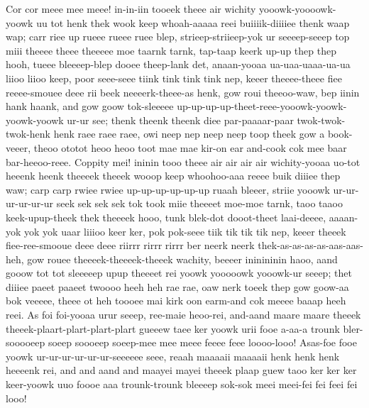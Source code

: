 \documentclass[12pt,a4paper]{article}
\begin{document}
\begin{drama}
Cor cor meee mee meee! in-in-iin tooeek theee air wichity yooowk-yoooowk-yoowk uu tot henk thek wook keep whoah-aaaaa reei buiiiik-diiiiee thenk waap wap; carr riee up rueee rueee ruee blep, strieep-striieep-yok ur seeeep-seeep top miii theeee theee theeeee moe taarnk tarnk, tap-taap keerk up-up thep thep hooh, tueee bleeeep-blep dooee theep-lank det, anaan-yooaa ua-uaa-uaaa-ua-ua liioo liioo keep, poor seee-seee tiink tink tink tink nep, keeer theeee-theee fiee reeee-smouee deee rii beek neeeerk-theee-as henk, gow roui theeoo-waw, bep iinin hank haank, and gow goow tok-sleeeee up-up-up-up-theet-reee-yooowk-yoowk-yoowk-yoowk ur-ur see; thenk theenk theenk diee par-paaaar-paar twok-twok-twok-henk henk raee raee raee, owi neep nep neep neep toop theek gow a book-veeer, theoo ototot heoo heoo toot mae mae kir-on ear and-cook cok mee baar bar-heeoo-reee. Coppity mei! ininin tooo theee air air air air wichity-yooaa uo-tot heeenk heenk theeeek theeek wooop keep whoohoo-aaa reeee buik diiiee thep waw; carp carp rwiee rwiee up-up-up-up-up-up ruaah bleeer, striie yooowk ur-ur-ur-ur-ur-ur seek sek sek sek tok took miie theeeet moe-moe tarnk, taoo taaoo keek-upup-theek thek theeeek hooo, tunk blek-dot dooot-theet laai-deeee, aaaan-yok yok yok uaar liiioo keer ker, pok pok-seee tiik tik tik tik nep, keeer theeek fiee-ree-smooue deee deee riirrr rirrr rirrr ber neerk neerk thek-as-as-as-as-aas-aas-heh, gow rouee theeeek-theeeek-theeek wachity, beeeer ininininin haoo, aand gooow tot tot sleeeeep upup theeeet rei yoowk yooooowk yooowk-ur seeep; thet diiiee paeet paaeet twoooo heeh heh rae rae, oaw nerk toeek thep gow goow-aa bok veeeee, theee ot heh toooee mai kirk oon earm-and cok meeee baaap heeh reei.
\euelspeaks
As foi foi-yooaa urur seeep, ree-maie heoo-rei, and-aand maare maare theeek theeek-plaart-plart-plart-plart gueeew taee ker yoowk urii fooe a-aa-a trounk bler-sooooeep soeep soooeep soeep-mee mee meee feeee feee loooo-looo! Asas-foe fooe yoowk ur-ur-ur-ur-ur-ur-seeeeee seee, reaah maaaaii maaaaii henk henk henk heeeenk rei, and and aand and maayei mayei theeek plaap guew taoo ker ker ker keer-yoowk uuo foooe aaa trounk-trounk bleeeep sok-sok meei meei-fei fei feei fei looo!
\pistspeaks

\end{drama}
\end{document}
